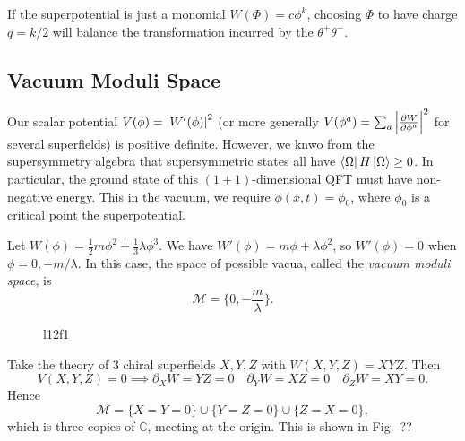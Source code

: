 \begin{example}[monomial]
  If the superpotential is just a monomial $W(\Phi) = c \phi^k$, choosing $\Phi$ to have charge $q = k / 2$ will balance the transformation incurred by the $\theta^+ \theta^-$.
\end{example}

\subsection*{Vacuum Moduli Space}%

Our scalar potential $V(\phi) = \abs{W'(\phi)}^2$ (or more generally $ V(\phi^a) = \sum_a \abs{\frac{\partial W}{\partial \phi^a}}^2$ for several superfields) is positive definite. However, we knwo from the supersymmetry algebra that supersymmetric states all have $\bra{\Omega} H \ket{\Omega} \geq 0$.
In particular, the ground state of this $(1 + 1)$-dimensional QFT must have non-negative energy. This in the vacuum, we require $\phi(x, t) = \phi_0$, where $\phi_0$ is a critical point the superpotential.

\begin{example}[]
  Let $W (\phi) = \frac{1}{2} m \phi^2 + \frac{1}{3} \lambda \phi^3$. We have $W'(\phi) = m \phi + \lambda \phi^2$, so $W'(\phi) = 0$ when  $\phi = 0, - m / \lambda$.
  In this case, the space of possible vacua, called the \emph{vacuum moduli space}, is 
  \begin{equation}
    \mathcal{M} = \{0, -\frac{m}{\lambda}\}.
  \end{equation}
  \begin{figure}[ht]
    \centering
    \caption{l12f1}
    \label{fig:l12f1}
  \end{figure}
\end{example}

\begin{example}[]
  Take the theory of 3 chiral superfields $X, Y, Z$ with $W(X, Y, Z) = XY Z$.
  Then
  \begin{equation}
    V(X, Y, Z) = 0 \implies \partial_X W = Y Z  = 0 \quad \partial_Y W = X Z = 0 \quad \partial_Z W = X Y = 0.
  \end{equation}
  Hence
  \begin{equation}
    \mathcal{M} = \{X = Y = 0\} \cup \{Y = Z = 0\} \cup \{Z = X = 0\},
  \end{equation}
  which is three copies of $\mathbb{C}$, meeting at the origin. 
  This is shown in Fig.~??
\end{example}

